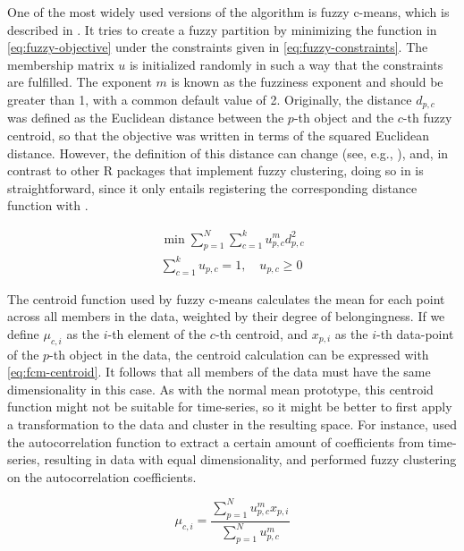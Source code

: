 One of the most widely used versions of the algorithm is fuzzy c-means,
which is described in \citet{bezdek1981}.
It tries to create a fuzzy partition by minimizing the function in \cref{eq:fuzzy-objective} under the constraints given in \cref{eq:fuzzy-constraints}.
The membership matrix $u$ is initialized randomly in such a way that the constraints are fulfilled.
The exponent $m$ is known as the fuzziness exponent and should be greater than 1,
with a common default value of 2.
Originally, the distance $d_{p,c}$ was defined as the Euclidean distance between the $p$-th object and the $c$-th fuzzy centroid,
so that the objective was written in terms of the squared Euclidean distance.
However, the definition of this distance can change (see, e.g., \citet{durso2009}),
and, in contrast to other R packages that implement fuzzy clustering,
doing so in \dtwclust{} is straightforward,
since it only entails registering the corresponding distance function with .

\begin{subequations}
\begin{gather}
\min \sum^N_{p = 1} \sum^k_{c = 1} u^m_{p,c} d^2_{p,c} \label{eq:fuzzy-objective} \\
\sum^k_{c = 1} u_{p,c} = 1, \quad u_{p,c} \geq 0 \label{eq:fuzzy-constraints}
\end{gather}
\end{subequations}

The centroid function used by fuzzy c-means calculates the mean for each point across all members in the data,
weighted by their degree of belongingness.
If we define $\mu_{c,i}$ as the $i$-th element of the $c$-th centroid,
and $x_{p,i}$ as the $i$-th data-point of the $p$-th object in the data,
the centroid calculation can be expressed with \cref{eq:fcm-centroid}.
It follows that all members of the data must have the same dimensionality in this case.
As with the normal mean prototype,
this centroid function might not be suitable for time-series,
so it might be better to first apply a transformation to the data and cluster in the resulting space.
For instance,
\citet{durso2009} used the autocorrelation function to extract a certain amount of coefficients from time-series,
resulting in data with equal dimensionality,
and performed fuzzy clustering on the autocorrelation coefficients.

\begin{equation}
\label{eq:fcm-centroid}
\mu_{c,i} = \frac{\sum^N_{p = 1} u^m_{p,c} x_{p,i}}{\sum^N_{p = 1} u^m_{p,c}}
\end{equation}

